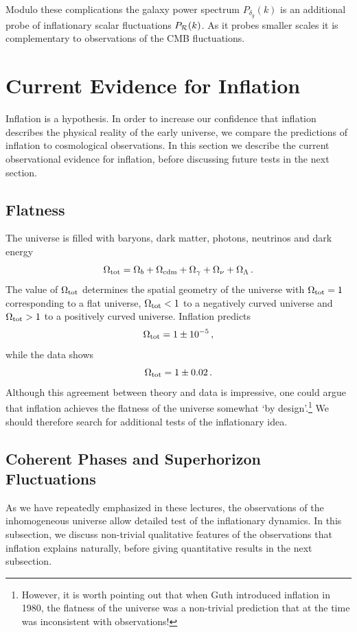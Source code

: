 \documentclass[12pt,letterpaper,rotate]{article}
\def\beq{\begin{equation}}
\def\eeq{\end{equation}}
\def\R{{\cal R}}
\begin{document}
{Modulo these complications the galaxy power spectrum $P_{\delta_g}(k)$ is an additional probe of inflationary scalar fluctuations $P_\R(k)$.  As it probes smaller scales it is complementary to observations of the CMB fluctuations.

\section{Current Evidence for Inflation}
\label{sec:evidence}

Inflation is a hypothesis.
In order to increase our confidence that inflation describes the physical reality of the early universe, we compare the predictions of inflation to cosmological observations.
In this section we describe the current observational evidence for inflation, before discussing future tests in the next section.


\subsection{Flatness}

The universe is filled with baryons, dark matter, photons, neutrinos and dark energy
\beq
\Omega_{\rm tot} = \Omega_b + \Omega_{\rm cdm} + \Omega_\gamma + \Omega_\nu + \Omega_\Lambda\, .
\eeq
The value of $\Omega_{\rm tot}$ determines the spatial geometry of the universe with $\Omega_{\rm tot}=1$ corresponding to a flat universe, $\Omega_{\rm tot} < 1$ to a negatively curved universe and $\Omega_{\rm tot} > 1$ to a positively curved universe.
Inflation predicts
\beq
\Omega_{\rm tot} = 1 \pm 10^{-5}\, ,
\eeq
while the
data shows~\cite{WMAP5}
\beq
\Omega_{\rm tot} = 1 \pm 0.02\, .
\eeq
Although this agreement between theory and data is impressive, one could argue that inflation achieves the flatness of the universe somewhat `by design'.\footnote{However, it is worth pointing out that when Guth introduced inflation in 1980, the flatness of the universe was a non-trivial prediction that at the time was inconsistent with observations!}
We should therefore search for additional tests of the inflationary idea.


\subsection{Coherent Phases and Superhorizon Fluctuations}

As we have repeatedly emphasized in these lectures, the observations of the inhomogeneous universe allow detailed test of the inflationary dynamics.
In this subsection, we discuss non-trivial qualitative features of the observations that inflation explains naturally, before giving quantitative results in the next subsection.

}
\end{document}
